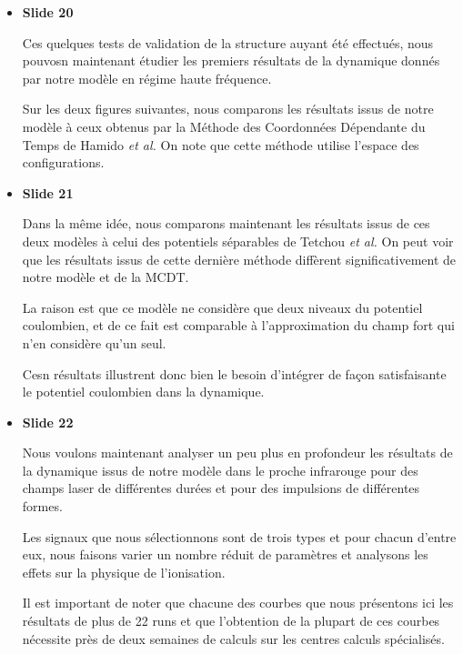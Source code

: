 \documentclass[10pt,a4paper]{article}
\begin{document}
\begin{itemize}
Accessoirement, on peut \'evaluer les polarisabilit\'es calcul\'ees 
\`a partir de notre mod\`ele \`a celles donn\'ees par la formule th\'eorique.
Le tableau ci-bas pr\'esente ces r\'esultats pour de l'hydrog\`ene atomique 
et l'ion h\'elium dans son \'etat initial $2s$.
On peut voir que l'on reproduit parfaitement les valeurs th\'eoriques,

\item \textbf{Slide 20}\par
Ces quelques tests de validation de la structure auyant \'et\'e effectu\'es, 
nous pouvosn maintenant \'etudier les premiers r\'esultats de
la dynamique donn\'es par notre mod\`ele en r\'egime haute fr\'equence.

Sur les deux figures suivantes, nous comparons les r\'esultats 
issus de notre mod\`ele \`a ceux obtenus par la M\'ethode des 
Coordonn\'ees D\'ependante du Temps de Hamido \textit{et al.}
On note que cette m\'ethode utilise l'espace des configurations.

\item \textbf{Slide 21}\par
Dans la m\^eme id\'ee, nous comparons maintenant les r\'esultats 
issus de ces deux mod\`eles \`a celui des potentiels s\'eparables 
de Tetchou \textit{et al.}
On peut voir que les r\'esultats issus de cette derni\`ere m\'ethode
diff\`erent significativement de notre mod\`ele et de la MCDT.

La raison est que ce mod\`ele ne consid\`ere que deux niveaux 
du potentiel coulombien, et de ce fait est comparable \`a l'approximation du champ 
fort qui n'en consid\`ere qu'un seul.

Cesn r\'esultats illustrent donc bien le besoin d'int\'egrer 
de fa\c con satisfaisante le potentiel coulombien dans la dynamique.

\item \textbf{Slide 22}\par
Nous voulons maintenant analyser un peu plus en profondeur 
les r\'esultats de la dynamique issus de notre mod\`ele 
dans le proche infrarouge pour des champs laser de diff\'erentes dur\'ees 
et pour des impulsions de diff\'erentes formes.

Les signaux que nous s\'electionnons sont de trois types et pour 
chacun d'entre eux, nous faisons varier un nombre r\'eduit de param\`etres 
et analysons les effets sur la physique de l'ionisation.

Il est important de noter que chacune des courbes que nous
pr\'esentons ici les r\'esultats de plus de 22 runs et 
que l'obtention de la plupart de ces courbes n\'ecessite pr\`es de deux semaines 
de calculs sur les centres calculs sp\'ecialis\'es.


\end{itemize}
\end{document}
